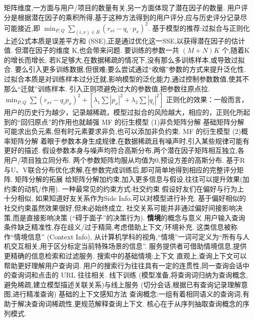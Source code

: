 \documentclass[10pt, utf8]{ctexart}
\begin{document}
\begin{multicols}{4}
    矩阵维度,一方面与用户/项目的数量有关,另一方面体现了潜在因子的数量.
    用户评分是根据潜在因子的乘积所得,基于这种方法得到的用户评分,应与历史评分记录尽可能接近,即
    $\min_{P,Q}\sum_{(i,x)\in R}{(r_{xi}-q_{i}\cdot p_{x})}^2$.
        {\color{blue}基于模型的推荐:过拟合与正则化}
    上述公式本质是误差平方和 (SSE),正是通过优化这一SSE,以获得潜在因子的估计值.
    但潜在因子的维度 K,也会带来问题.
    要训练的参数一共 $(M+N)K$ 个,随着K的增长而增长,
    若K足够大,在数据稀疏的情况下,没有那么多训练样本,或导致过拟合.
    要么引入更多训练数据,但很难;要么尝试通过“收缩”参数的方式来提升泛化性.
    过拟合本质是对训练样本过分迁就,影响模型的泛化能力,通过控制参数数值,使其不那么“迁就”训练样本.
    引入正则项避免过大的参数值,把参数往原点拉. $\min_{P,Q}\sum{(r_{xi}-q_{i}p_{x})}^2+[\lambda_{1}\sum{|p_x|}^2+\lambda_{2}\sum{|q_i|}^2]$
    {\color{blue}正则化的效果}：一般而言，用户的历史行为越少，记录越稀疏，模型过拟合的风险越大，相应的，正则化所起到的“回归原点”的作用也就越强
    {\color{blue}MF 的衍生模型 (1)非负矩阵分解}
    基础矩阵分解可能求出负元素,但有时元素要求非负,也可以添加非负约束.
    {\color{blue}MF 的衍生模型 (2)概率矩阵分解}
    着眼于参数本身生成规律,在数据稀疏且有噪声时,引入某些规律可能有更好的描述.
    假设参数本身与噪声均符合高斯分布,两个潜在因子矩阵相互独立,各用户/项目独立同分布.
    两个参数矩阵均服从均值为0,预设方差的高斯分布.
    基于R与U、V联合分布优化求解,在参数完成训练后,即可简单地得到相应的完整评分矩阵.
    {\color{blue}矩阵分解的拓展}
    给矩阵分解加约束,加入更多信息与假设,往往可以提升效果(加约束的动机/作用).
    {\color{blue}一种最常见的约束方式:社交约束}
    假设好友们在偏好与行为上十分相似,
    如果知道好友关系作为Side Info,可以对模型进行补充.
    基于偏好相似的社交约束虽然效果很好,但未必始终成立,
    社交关系可能并非通过偏好间接影响决策,而是直接影响决策 (“碍于面子”的决策行为).
        {\color{purple_}\textbf{情境}\color{blue}的概念与意义}
    用户输入查询条件缺乏精准性,存在歧义/过于精简,考虑借助上下文/环境补充.
    这类信息被称作“情境信息” (Context Info),
    从计算机学科的视角,“情境”一词可定义为“所有与人机交互相关,用于区分标定当前特殊场景的信息”.
    服务提供者可借助情境信息,提供更精确的信息检索和过滤服务.
    {\color{blue}搜索中的基础情境:上下文}
    直观上,查询上下文可以帮助更好理解用户查询词.
    用户的搜索行为往往具有一定的连贯性,同一查询会话中的查询词和点击的 URL 往往相关.
    线下训练 (模型准备,将查询词归纳为查询概念,避免稀疏,建立模型描述关联关系)与线上服务 (切分会话,根据已有查询记录理解意图,进行精准查询)
    {\color{blue}基础的上下文感知方法}
    查询概念:一组有着相同语义的查询词,有助于解决查询词稀疏性,更规范解释查询上下文.
    核心在于从序列抽取查询概念的序列模式.

\end{multicols}
\end{document}
